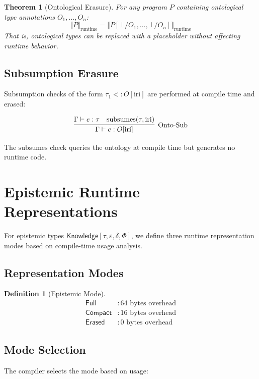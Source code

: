 \documentclass[11pt]{article}
\newtheorem{definition}{Definition}
\newtheorem{theorem}{Theorem}
\newcommand{\Knowledge}{\mathsf{Knowledge}}
\newcommand{\Full}{\mathsf{Full}}
\newcommand{\Compact}{\mathsf{Compact}}
\newcommand{\Erased}{\mathsf{Erased}}
\begin{document}
\begin{theorem}[Ontological Erasure]
For any program $P$ containing ontological type annotations $O_1, \ldots, O_n$:
\[
\llbracket P \rrbracket_{\text{runtime}} = \llbracket P[\bot/O_1, \ldots, \bot/O_n] \rrbracket_{\text{runtime}}
\]
That is, ontological types can be replaced with a placeholder without
affecting runtime behavior.
\end{theorem}

\subsection{Subsumption Erasure}

Subsumption checks of the form $\tau_1 <: O[\text{iri}]$ are performed at
compile time and erased:

\[
\infer[\text{Onto-Sub}]{\Gamma \vdash e : O[\text{iri}]}
      {\Gamma \vdash e : \tau & \text{subsumes}(\tau, \text{iri})}
\]

The $\text{subsumes}$ check queries the ontology at compile time but generates
no runtime code.

\section{Epistemic Runtime Representations}

For epistemic types $\Knowledge[\tau, \varepsilon, \delta, \Phi]$, we define
three runtime representation modes based on compile-time usage analysis.

\subsection{Representation Modes}

\begin{definition}[Epistemic Mode]
\begin{align*}
\Full &: 64 \text{ bytes overhead} \\
\Compact &: 16 \text{ bytes overhead} \\
\Erased &: 0 \text{ bytes overhead}
\end{align*}
\end{definition}

\subsection{Mode Selection}

The compiler selects the mode based on usage:
\end{document}
